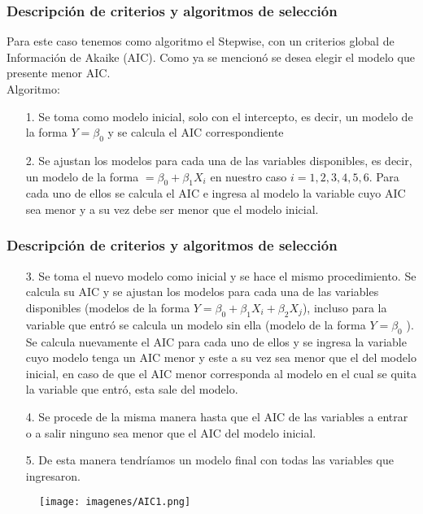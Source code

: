 \documentclass[12pt]{beamer}
\begin{document}
\begin{frame}
\frametitle{Descripción de criterios y algoritmos de selección}
Para este caso tenemos como algoritmo el Stepwise, con un criterios global de Información de Akaike (AIC). Como ya se mencionó se desea elegir el modelo que presente menor AIC.
~\\Algoritmo:
\begin{itemize}
\item[1.] Se toma como modelo inicial, solo con el intercepto, es decir, un modelo de la forma $Y=\beta_{0}$ y se calcula el AIC correspondiente
\item[2.] Se ajustan los modelos para cada una de las variables disponibles, es decir, un modelo de la forma $=\beta_{0}+\beta_{1}X_{i}$ en nuestro caso $i=1,2,3,4,5,6$. Para cada uno de ellos se calcula el AIC e ingresa al modelo la variable cuyo AIC sea menor y a su vez debe ser menor que el modelo inicial.
\end{itemize}
\end{frame}

\begin{frame}
\frametitle{Descripción de criterios y algoritmos de selección}
\begin{itemize}
\item[3.] Se toma el nuevo modelo como inicial y se hace el mismo procedimiento. Se calcula su AIC y se ajustan los modelos para cada una de las variables disponibles (modelos de la forma $Y=\beta_{0}+\beta_{1}X_{i}+\beta_{2}X_{j}$), incluso para la variable que entró se calcula un modelo sin ella (modelo de la forma $Y=\beta_{0}$ ). Se calcula nuevamente el AIC para cada uno de ellos y se ingresa la variable cuyo modelo tenga un AIC menor y este a su vez sea menor que el del modelo inicial, en caso de que el AIC menor corresponda al modelo en el cual se quita la variable que entró, esta sale del modelo.
\item[4.] Se procede de la misma manera hasta que el AIC de las variables a entrar o a salir ninguno sea menor que el AIC del modelo inicial.
\item[5.] De esta manera tendríamos un modelo final con todas las variables que ingresaron.
\end{itemize}
\end{frame}

\begin{frame}
\begin{figure}[h]
  \centering
  \texttt{[image: imagenes/AIC1.png]}
\end{figure}
\end{frame}
\end{document}
